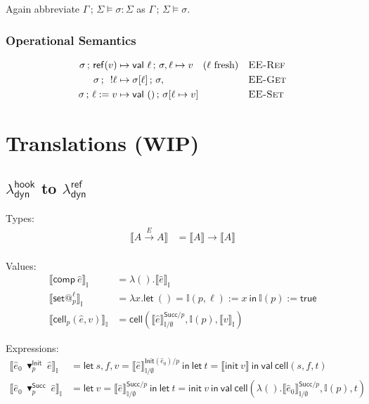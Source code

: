 \documentclass{article}
\makeatletter
\newcommand{\mf}[1]{\mathsf{#1}}
\newcommand{\semi}{\,;\,}
\newcommand{\llrr}[1]{\llbracket #1 \rrbracket}
\newcommand{\arrow}[1]{\xrightarrow{#1}}
\newcommand{\vset}[2]{\mf{set}@^{#1}_{#2}}
\newcommand{\I}{\mathbb{I}}
\newcommand{\elet}[3]{\mf{let}\ #1 = #2\ \mf{in}\ #3}
\newcommand{\eref}[1]{\mf{ref}(#1)}
\newcommand{\eget}[1]{\ !#1}
\newcommand{\eset}[2]{#1 := #2}
\newcommand{\einit}[1]{\mf{init}\ #1}
\makeatother
\begin{document}
Again abbreviate $\Gamma \semi \Sigma \vDash \sigma: \Sigma$
as $\Gamma \semi \Sigma \vDash \sigma$.

\subsubsection{Operational Semantics}

\fbox{$\sigma \semi e \mapsto e' \semi \sigma'$}
\begin{align*}
\sigma \semi \eref{v} &\mapsto \mf{val}\ \ell \semi \sigma, \ell \mapsto v
\quad (\ell\ \text{fresh})
&&\textsc{EE-Ref}\\
\sigma \semi \eget{\ell} &\mapsto \sigma[\ell] \semi \sigma,
&&\textsc{EE-Get}\\
\sigma \semi \eset{\ell}{v} &\mapsto \mf{val}\ () \semi \sigma[\ell \mapsto v]
&&\textsc{EE-Set}
\end{align*}

\section{Translations (WIP)}

\subsection{$\lambda^\mf{hook}_\mf{dyn}$ to $\lambda^\mf{ref}_\mf{dyn}$}

Types:
\begin{align*}
\llrr{A \arrow{E} A} &= \llrr{A} \rightarrow \llrr{A}\\
\end{align*}

Values:
\begin{align*}
\llrr{\mf{comp}\ \hat{e}}_\I &= \lambda().\llrr{\hat{e}}_\I\\
\llrr{\vset{\ell}{p}}_\I &= 
\lambda x.\elet{()}{\eset{\I(p,\ell)}{x}}{\eset{\I(p)}{\mf{true}}}\\
\llrr{\mf{cell}_p(\hat{e}, v)}_\I &= \mf{cell}(
  \llrr{\hat{e}}^{\mf{Succ}/p}_{\I/\emptyset},
  \I(p),
  \llrr{v}_\I
)
\end{align*}

Expressions:
\begin{align*}
\llrr{\hat{e}_0\ \blacktriangledown^{\mf{Init}}_p\ \hat{e}}_\I
&= \elet{s, f, v}{\llrr{\hat{e}}^{\mf{Init}(\hat{e}_0)/p}_{\I/\emptyset}}{
  \elet{t}{\llrr{\einit{v}}}{\mf{val}\ \mf{cell}(s, f, t)}
}\\
\llrr{\hat{e}_0\ \blacktriangledown^{\mf{Succ}}_p\ \hat{e}}_\I
&= \elet{v}{\llrr{\hat{e}}^{\mf{Succ}/p}_{\I/\emptyset}}{
  \elet{t}{\einit{v}}{\mf{val}\ \mf{cell}(
    \lambda().\llrr{\hat{e}_0}^{\mf{Succ}/p}_{\I/\emptyset},
    \I(p),
    t
  )}
}
\end{align*}
\end{document}
